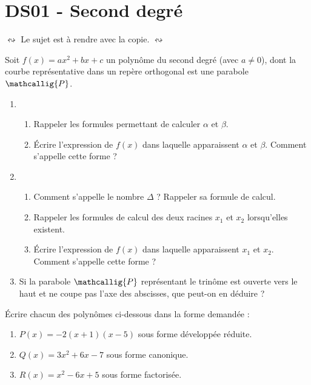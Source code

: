 \documentclass[a4paper,11pt]{article}
\author{Pierquet}
\title{\nomfichier}
\begin{document}
\pagestyle{fancy}

\thispagestyle{enteteds}

\setcounter{numexos}{0}

\part{DS01 - Second degré}

\smallskip

\begin{marker}$\leftrightsquigarrow$ Le sujet est à rendre avec la copie. $\leftrightsquigarrow$\end{marker}

\nomprenomtcbox

\medskip


\medskip

Soit $f(x)=ax^2+bx+c$ un polynôme du second degré (avec $a \neq 0$), dont la courbe représentative dans un repère orthogonal est une parabole $\mathcallig{P}$.
%
\begin{enumerate}
	\item 
	\begin{enumerate}
		\item Rappeler les formules permettant de calculer $\alpha$ et $\beta$.
		\item Écrire l'expression de $f(x)$ dans laquelle apparaissent $\alpha$ et $\beta$. Comment s'appelle cette forme ?
	\end{enumerate}
	\item 
	\begin{enumerate}
		\item Comment s'appelle le nombre $\Delta$ ? Rappeler sa formule de calcul.
		\item Rappeler les formules de calcul des deux racines $x_1$ et $x_2$ lorsqu'elles existent.
		\item Écrire l'expression de $f(x)$ dans laquelle apparaissent $x_1$ et $x_2$. Comment s'appelle cette forme ?
	\end{enumerate}
	\item Si la parabole $\mathcallig{P}$ représentant le trinôme est \og ouverte vers le haut \fg{} et ne coupe pas l'axe des abscisses, que peut-on en déduire ?
\end{enumerate}

\medskip


\medskip

Écrire chacun des polynômes ci-dessous dans la forme demandée :
%
\begin{enumerate}
	\item $P(x)=-2(x+1)(x-5)$ sous forme développée réduite.
	\item $Q(x)=3x^2+6x-7$ sous forme canonique.
	\item $R(x)=x^2-6x+5$ sous forme factorisée.
\end{enumerate}
\end{document}
